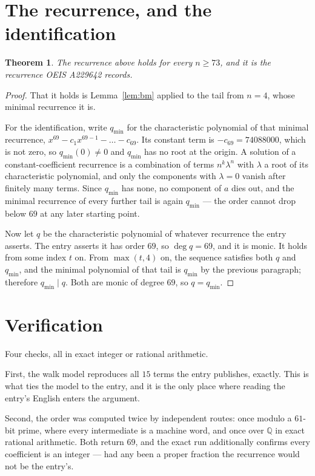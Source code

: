 \documentclass[11pt,a4paper]{article}
\theoremstyle{plain}
\newtheorem{theorem}{Theorem}
\theoremstyle{definition}
\begin{document}
\section{The recurrence, and the identification}

\begin{theorem}
The recurrence above holds for every $n\ge73$, and it is the recurrence OEIS A229642 records.
\end{theorem}

\begin{proof}
That it holds is Lemma~\ref{lem:bm} applied to the tail from $n=4$, whose minimal
recurrence it is.

For the identification, write $q_{\min}$ for the characteristic polynomial of that minimal
recurrence, $x^{69}-c_1x^{69-1}-\dots-c_{69}$. Its constant term is
$-c_{69}=74088000$, which is not zero, so $q_{\min}(0)\neq0$ and $q_{\min}$ has no
root at the origin. A solution of a constant-coefficient recurrence is a combination of terms
$n^{k}\lambda^{n}$ with $\lambda$ a root of its characteristic polynomial, and only the
components with $\lambda=0$ vanish after finitely many terms. Since $q_{\min}$ has none, no
component of $a$ dies out, and the minimal recurrence of every further tail is again
$q_{\min}$ --- the order cannot drop below $69$ at any later starting point.

Now let $q$ be the characteristic polynomial of whatever recurrence the entry asserts. The
entry asserts it has order $69$, so $\deg q=69$, and it is monic. It holds from some
index $t$ on. From $\max(t,4)$ on, the sequence satisfies both $q$ and $q_{\min}$, and
the minimal polynomial of that tail is $q_{\min}$ by the previous paragraph; therefore
$q_{\min}\mid q$. Both are monic of degree $69$, so $q=q_{\min}$.
\end{proof}

\section{Verification}

Four checks, all in exact integer or rational arithmetic.

First, the walk model reproduces all $15$ terms the entry publishes, exactly. This is
what ties the model to the entry, and it is the only place where reading the entry's English
enters the argument.

Second, the order was computed twice by independent routes: once modulo a $61$-bit prime, where
every intermediate is a machine word, and once over $\mathbb{Q}$ in exact rational arithmetic.
Both return $69$, and the exact run additionally confirms every coefficient is an integer
--- had any been a proper fraction the recurrence would not be the entry's.
\end{document}
